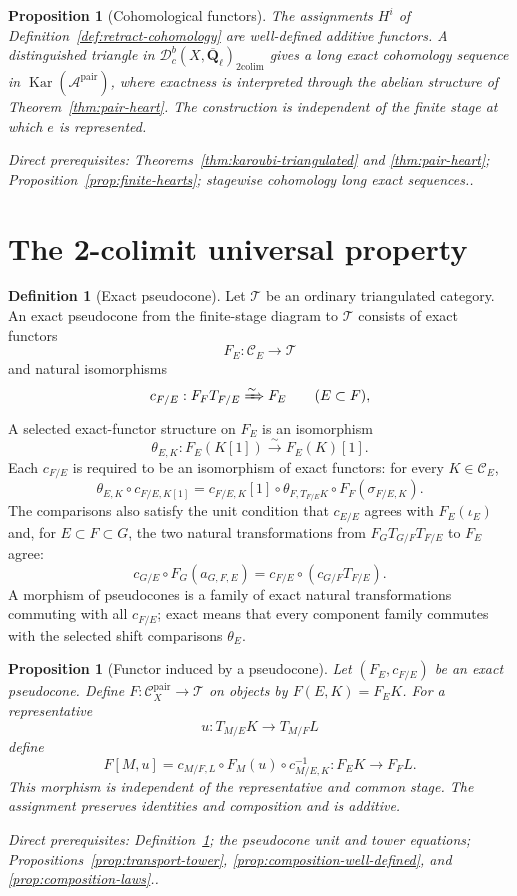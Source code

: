 \documentclass[10pt]{article}
\newtheorem{proposition}[theorem]{Proposition}
\theoremstyle{definition}
\newtheorem{definition}[theorem]{Definition}
\newcommand{\Qlb}{\overline{\mathbf Q}_\ell}
\newcommand{\Dbc}{\mathcal D^b_c}
\newcommand{\Kar}{\operatorname{Kar}}
\newcommand{\Pair}{\mathcal C_X^{\mathrm{pair}}}
\newcommand{\depends}[1]{\par\smallskip\noindent\textit{Direct prerequisites:} #1.}
\begin{document}
\begin{proposition}[Cohomological functors]\label{prop:retract-cohomology}
The assignments $H^i$ of Definition~\ref{def:retract-cohomology} are
well-defined additive functors.  A distinguished triangle in
$\Dbc(X,\Qlb)_{\mathrm{2colim}}$ gives a long exact cohomology sequence in
$\Kar(\mathcal A^{\mathrm{pair}})$, where exactness is interpreted through
the abelian structure of Theorem~\ref{thm:pair-heart}.  The construction is
independent of the finite stage at which $e$ is represented.
\depends{Theorems~\ref{thm:karoubi-triangulated} and
\ref{thm:pair-heart}; Proposition~\ref{prop:finite-hearts}; stagewise
cohomology long exact sequences.}
\end{proposition}

\section{The 2-colimit universal property}

\begin{definition}[Exact pseudocone]\label{def:pseudocone}
Let $\mathcal T$ be an ordinary triangulated category.  An exact pseudocone
from the finite-stage diagram to $\mathcal T$ consists of exact functors
\[
 F_E:\mathcal C_E\longrightarrow\mathcal T
\]
and natural isomorphisms
\[
 c_{F/E}:F_FT_{F/E}\xRightarrow{\sim}F_E
 \qquad(E\subset F),
\]
A selected exact-functor structure on $F_E$ is an isomorphism
\[
 \theta_{E,K}:F_E(K[1])\xrightarrow{\sim}F_E(K)[1].
\]
Each $c_{F/E}$ is required to be an isomorphism of exact functors: for every
$K\in\mathcal C_E$,
\[
 \theta_{E,K}\circ c_{F/E,K[1]}
 =c_{F/E,K}[1]\circ\theta_{F,T_{F/E}K}
   \circ F_F(\sigma_{F/E,K}).
\]
The comparisons also satisfy the unit condition that $c_{E/E}$ agrees with
$F_E(\iota_E)$ and, for
$E\subset F\subset G$, the two natural transformations from
$F_GT_{G/F}T_{F/E}$ to $F_E$ agree:
\[
 c_{G/E}\circ F_G(a_{G,F,E})
 =c_{F/E}\circ(c_{G/F}T_{F/E}).
\]
A morphism of pseudocones is a family of exact natural transformations
commuting with all $c_{F/E}$; exact means that every component family
commutes with the selected shift comparisons $\theta_E$.
\end{definition}

\begin{proposition}[Functor induced by a pseudocone]
\label{prop:pseudocone-functor}
Let $(F_E,c_{F/E})$ be an exact pseudocone.  Define
$F:\Pair\to\mathcal T$ on objects by $F(E,K)=F_EK$.  For a representative
\[
 u:T_{M/E}K\longrightarrow T_{M/F}L
\]
define
\[
 F[M,u]=
 c_{M/F,L}\circ F_M(u)\circ c_{M/E,K}^{-1}:
 F_EK\longrightarrow F_FL.
\]
This morphism is independent of the representative and common stage.  The
assignment preserves identities and composition and is additive.
\depends{Definition~\ref{def:pseudocone}; the pseudocone unit and tower
equations; Propositions~\ref{prop:transport-tower},
\ref{prop:composition-well-defined}, and \ref{prop:composition-laws}.}
\end{proposition}
\end{document}
